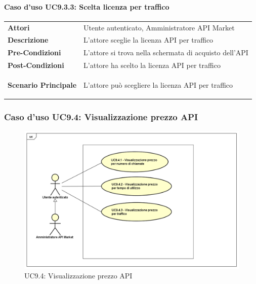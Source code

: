 \paragraph{Caso d'uso UC9.3.3: Scelta licenza per traffico}
\label{UC9_3_3}

\begin{minipage}{\linewidth}
	\begin{tabular}{ l | p{11cm}}
		\hline
		\rowcolor{Gray}
		\multicolumn{2}{c}{UC9.3.3 - Scelta licenza per traffico} \\
		\hline
		\textbf{Attori} & Utente autenticato, Amministratore API Market \\
		\textbf{Descrizione} & L'attore sceglie la licenza API per traffico \\
		\textbf{Pre-Condizioni} & L'attore si trova nella schermata di acquisto dell'API \\
		\textbf{Post-Condizioni} & L'attore ha scelto la licenza API per traffico \\
		\textbf{Scenario Principale} & 
		\begin{enumerate*}[label=(\arabic*.),itemjoin={\newline}]
			\item L'attore può scegliere la licenza API per traffico
		\end{enumerate*}\\
	\end{tabular}
\end{minipage}

\newpage
\subsubsection{Caso d'uso UC9.4: Visualizzazione prezzo API}
\label{UC9_4}
\begin{figure}[ht]
	\centering
	\includegraphics[scale=0.45]{UML/UC9_4.png}
	\caption{UC9.4: Visualizzazione prezzo API}
\end{figure}

